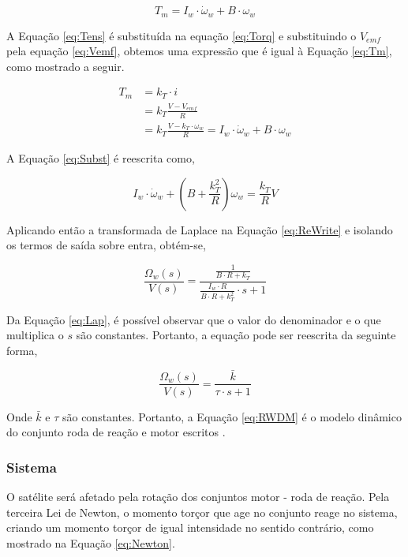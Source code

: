 \documentclass[
	12pt,				%
	openany,			%
	twoside,			%
	a4paper,			%
	english,			%
	french,				%
	spanish,			%
	brazil,				%
	oldfontcommands
	]{abntex2}
\begin{document}
\begin{equation}
T_{m} = I_{w} \cdot \dot{\omega}_{w} + B \cdot \omega_{w}
\label{eq:Tm}
\end{equation}

A Equação \ref{eq:Tens} é substituída na equação \ref{eq:Torq} e substituindo o $V_{emf}$ pela equação \ref{eq:Vemf}, obtemos uma expressão que é igual à Equação \ref{eq:Tm}, como mostrado a seguir.

\begin{align}
	T_{m} & = k_{T} \cdot i \nonumber \\
	& = k_{T} \frac{V - V_{emf}}{R} \nonumber \\
	& = k_{T} \frac{ V - k_{T} \cdot \omega_{w} }{R} = I_{w} \cdot \dot{\omega}_{w} + B \cdot \omega_{w}
\label{eq:Subst}
\end{align}

A Equação \ref{eq:Subst} é reescrita como,

\begin{equation}
I_{w} \cdot \dot{\omega}_{w} + \left( B + \frac{k_{T}^{2}}{R} \right) \omega_{w} = \frac{k_{T}}{R} V
\label{eq:ReWrite}
\end{equation}

Aplicando então a transformada de Laplace na Equação \ref{eq:ReWrite} e isolando os termos de saída sobre entra, obtém-se,

\begin{equation}
\frac{\Omega_{w}(s)}{V(s)} = \frac{\frac{1}{B \cdot R + k_{T}}}{\frac{I_{w} \cdot R}{B \cdot R + k_{T}^{2}} \cdot s +1}
\label{eq:Lap}
\end{equation}

Da Equação \ref{eq:Lap}, é possível observar que o valor do denominador e o que multiplica o $s$ são constantes. Portanto, a equação pode ser reescrita da seguinte forma,

\begin{equation}
\frac{\Omega_{w}(s)}{V(s)} = \frac{\bar{k}}{\tau \cdot s +1}
\label{eq:RWDM}
\end{equation}

Onde $\bar{k}$ e $\tau$ são constantes. Portanto, a Equação \ref{eq:RWDM} é o modelo dinâmico do conjunto roda de reação e motor escritos \cite{Ericksson}.

\subsubsection{Sistema}

O satélite será afetado pela rotação dos conjuntos motor - roda de reação. Pela terceira Lei de Newton, o momento torçor que age no conjunto reage no sistema, criando um momento torçor de igual intensidade no sentido contrário, como mostrado na Equação \ref{eq:Newton}.
\end{document}
